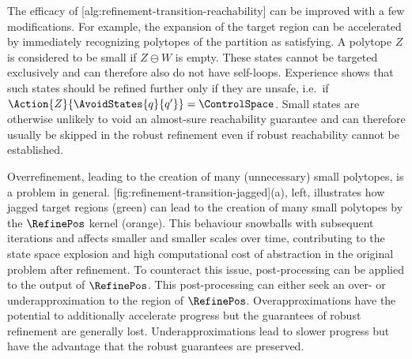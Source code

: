 
    The efficacy of [alg:refinement-transition-reachability] can be improved with a few modifications.
    For example, the expansion of the target region can be accelerated by immediately recognizing  polytopes of the partition as satisfying.
    A polytope $Z$ is considered to be small if $Z \ominus W$ is empty.
    These states cannot be targeted exclusively and can therefore also do not have self-loops.
    Experience shows that such states should be refined further only if they are unsafe, i.e.\ if $\Action{Z}{\AvoidStates{q}{q'}} = \ControlSpace$.
    Small states are otherwise unlikely to void an almost-sure reachability guarantee and can therefore usually be skipped in the robust refinement even if robust reachability cannot be established.

    Overrefinement, leading to the creation of many (unnecessary) small polytopes, is a problem in general.
    [fig:refinement-transition-jagged](a), left, illustrates how jagged target regions (green) can lead to the creation of many small polytopes by the $\RefinePos$ kernel (orange).
    This behaviour snowballs with subsequent iterations and affects smaller and smaller scales over time, contributing to the state space explosion and high computational cost of abstraction in the original problem after refinement.
    To counteract this issue, post-processing can be applied to the output of $\RefinePos$.
    This post-processing can either seek an over- or underapproximation to the region of $\RefinePos$.
    Overapproximations have the potential to additionally accelerate progress but the guarantees of robust refinement are generally lost.
    Underapproximations lead to slower progress but have the advantage that the robust guarantees are preserved.

